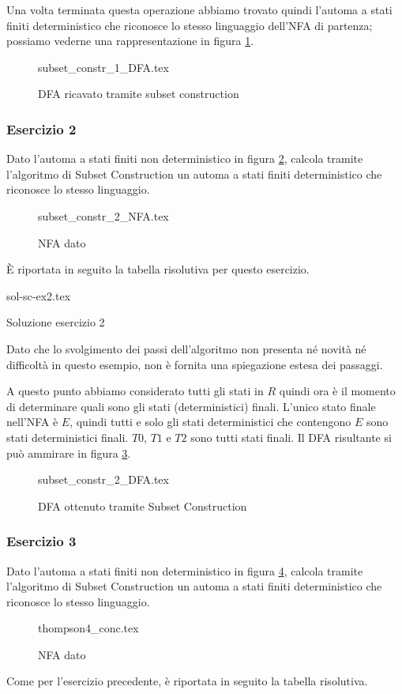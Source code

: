 \documentclass[class=book, crop=false, oneside, 12pt]{standalone}
\begin{document}
Una volta terminata questa operazione abbiamo trovato quindi l'automa a stati finiti deterministico che riconosce lo stesso linguaggio dell'NFA di partenza; possiamo vederne una rappresentazione in figura \ref{sol_sc_1}.
\begin{figure}[H]
    \centering
    {subset_constr_1_DFA.tex}
    \caption{DFA ricavato tramite subset construction}
    \label{sol_sc_1}
\end{figure}


\subsubsection*{Esercizio 2}
Dato l'automa a stati finiti non deterministico in figura \ref{es_sc_2}, calcola tramite l'algoritmo di Subset Construction un automa a stati finiti deterministico che riconosce lo stesso linguaggio.
\begin{figure}[H]
    \centering
    {subset_constr_2_NFA.tex}
    \caption{NFA dato}
    \label{es_sc_2}
\end{figure}
È riportata in seguito la tabella risolutiva per questo esercizio.\\

\begin{table}[H]
	\centering
	{sol-sc-ex2.tex}
    \caption{Soluzione esercizio 2}
    \label{sol-sc-ex2}
\end{table} 

Dato che lo svolgimento dei passi dell'algoritmo non presenta né novità né difficoltà in questo esempio, non è fornita una spiegazione estesa dei passaggi.

A questo punto abbiamo considerato tutti gli stati in \(R\) quindi ora è il momento di determinare quali sono gli stati (deterministici) finali. L'unico stato finale nell'NFA è \(E\), quindi tutti e solo gli stati deterministici che contengono \(E\) sono stati deterministici finali. \(T0\), \(T1\) e \(T2\) sono tutti stati finali. Il DFA risultante si può ammirare in figura \ref{sol_sc_2}.
\begin{figure}[H]
    \centering
    {subset_constr_2_DFA.tex}
    \caption{DFA ottenuto tramite Subset Construction}
    \label{sol_sc_2}
\end{figure}

\subsubsection*{Esercizio 3}
Dato l'automa a stati finiti non deterministico in figura \ref{es_sc_3}, calcola tramite l'algoritmo di Subset Construction un automa a stati finiti deterministico che riconosce lo stesso linguaggio.
\begin{figure}[H]
    \centering
    {thompson4_conc.tex}
    \caption{NFA dato}
    \label{es_sc_3}
\end{figure}
Come per l'esercizio precedente, è riportata in seguito la tabella risolutiva.\\
\end{document}

